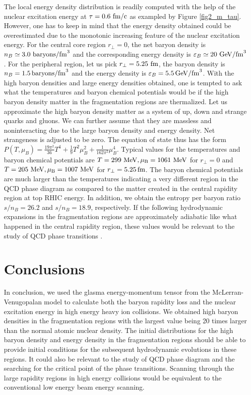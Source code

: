 \documentclass[a4paper]{jpconf}
\begin{document}
The local energy density distribution is readily computed with the help of the nuclear excitation energy at $\tau =0.6\,\, \rm{fm/c}$ as exampled by Figure \ref{fig2_m_tau}. However, one has to keep in mind that  the energy density obtained could be overestimated due to the monotonic increasing feature of the nuclear excitation energy.  For the central core region $r_{\perp}=0$, the net baryon density is $n_B \simeq 3.0\,\,\rm{baryons/fm}^3$ and the corresponding energy density is $\varepsilon_B \simeq20 \,\,\rm{GeV/fm}^3$. For the peripheral region, let us pick $r_{\perp} = 5.25\,\,\rm{fm}$, the baryon density is $n_B = 1.5\,\rm{baryons/fm}^3$ and the energy density is $\varepsilon_B = 5.5\,\rm{GeV/fm}^3$.  With the high baryon densities and large energy densities obtained, one is tempted to ask what the temperatures and baryon chemical potentials would be if the high baryon density matter in the fragmentation regions are thermalized. Let us approximate the high baryon density matter as a system of up, down and strange quarks and gluons. We can further assume that they are massless and noninteracting due to the large baryon density and energy density. Net strangeness is adjusted to be zero.  The equation of state thus has the form $P(T,\mu_B) = \frac{19\pi^2}{36}T^4 + \frac{1}{9}T^2\mu_B^2+\frac{1}{162\pi^2} \mu_B^4$. Typical values for the temperatures and baryon chemical potentials are $T = 299\,\,\rm{MeV}, \mu_B= 1061\,\,\rm{MeV}$ for $r_{\perp}=0$ and $T=205\,\,\rm{MeV}, \mu_B = 1007\,\,\rm{MeV}$ for $r_{\perp} = 5.25\,\rm{fm}$. The baryon chemical potentials are much larger than the temperatures indicating a very different region in the QCD phase diagram as compared to the matter created in the central rapidity region at top RHIC energy.  In addition, we obtain the entropy per baryon ratio $s/n_B = 26.2$ and  $s/n_B =18.9$, respectively.  If the following hydrodynamic expansions in the fragmentation regions are approximately adiabatic like what happened in the central rapidity region, these values would be relevant to the study of QCD phase transitions \cite{Asakawa2008}.
 
 

\section{Conclusions}
In conclusion, we used the glasma energy-momentum tensor from the McLerran-Venugopalan model to calculate both the baryon rapidity loss and the nuclear excitation energy in high energy heavy ion collisions. We obtained high baryon densities in the fragmentation regions with the largest value being 20 times larger than the normal atomic nuclear density. The initial distributions for the high baryon density and energy density in the fragmentation regions should be able to provide initial conditions for the subsequent hydrodynamic evolutions in these regions. It could also be relevant to the study of QCD phase diagram and the searching for the critical point of the phase transitions. Scanning through the large rapidity regions in high energy collisions would be equivalent to the conventional low energy beam energy scanning.
\end{document}
